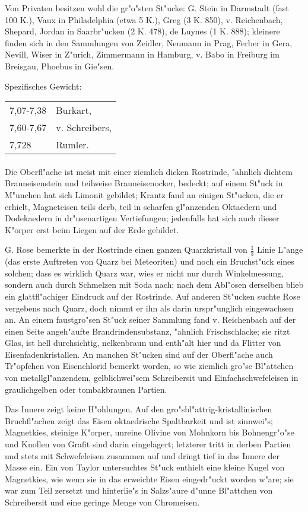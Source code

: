 \documentclass[a4paper, 11pt, oneside]{article}
\begin{document}
Von Privaten besitzen wohl die gr"o"sten St"ucke: G. Stein in Darmstadt (fast 100 K.), Vaux in Philadelphia (etwa 5 K.), Greg (3 K. 850), v. Reichenbach, Shepard, Jordan in Saarbr"ucken (2 K. 478), de Luynes (1 K. 888); kleinere finden sich in den Sammlungen von Zeidler, Neumann in Prag, Ferber in Gera, Nevill, Wiser in Z"urich, Zimmermann in Hamburg, v. Babo in Freiburg im Breisgau, Phoebus in Gie"sen.

Spezifisches Gewicht:  
\begin{table}[!ht]
    \centering
    \begin{tabular}{l l}
        7,07-7,38 & Burkart,\\
        7,60-7,67 & v. Schreibers,\\
        7,728 & Rumler.
    \end{tabular}
\end{table}
\paragraph{}
Die Oberfl"ache ist meist mit einer ziemlich dicken Rostrinde, "ahnlich dichtem Brauneisenstein und teilweise Brauneisenocker, bedeckt; auf einem St"uck in M"unchen hat sich Limonit gebildet; Krantz fand an einigen St"ucken, die er erhielt, Magneteisen teils derb, teil in scharfen gl"anzenden Oktaedern und Dodekaedern in dr"usenartigen Vertiefungen; jedenfalls hat sich auch dieser K"orper erst beim Liegen auf der Erde gebildet.

G. Rose bemerkte in der Rostrinde einen ganzen Quarzkristall von $\frac{1}{3}$ Linie L"ange (das erste Auftreten von Quarz bei Meteoriten) und noch ein Bruchst"uck eines solchen; dass es wirklich Quarz war, wies er nicht nur durch Winkelmessung, sondern auch durch Schmelzen mit Soda nach; nach dem Abl"osen derselben blieb ein glattfl"achiger Eindruck auf der Rostrinde. Auf anderen St"ucken suchte Rose vergebens nach Quarz, doch nimmt er ihn als darin urspr"unglich eingewachsen an. An einem faustgro"sen St"uck seiner Sammlung fand v. Reichenbach auf der einen Seite angeh"aufte Brandrindensubstanz, "ahnlich Frischschlacke; sie ritzt Glas, ist hell durchsichtig, nelkenbraun und enth"alt hier und da Flitter von Eisenfadenkristallen. An manchen St"ucken sind auf der Oberfl"ache auch Tr"opfchen von Eisenchlorid bemerkt worden, so wie ziemlich gro"se Bl"attchen von metallgl"anzendem, gelblichwei"sem Schreibersit und Einfachschwefeleisen in graulichgelben oder tombakbraunen Partien.

Das Innere zeigt keine H"ohlungen. Auf den gro"sbl"attrig-kristallinischen Bruchfl"achen zeigt das Eisen oktaedrische Spaltbarkeit und ist zinnwei"s; Magnetkies, steinige K"orper, unreine Olivine von Mohnkorn bis Bohnengr"o"se und Knollen von Grafit sind darin eingelagert; letzterer tritt in derben Partien und stets mit Schwefeleisen zusammen auf und dringt tief in das Innere der Masse ein. Ein von Taylor untersuchtes St"uck enthielt eine kleine Kugel von Magnetkies, wie wenn sie in das erweichte Eisen eingedr"uckt worden w"are; sie war zum Teil zersetzt und hinterlie"s in Salzs"aure d"unne Bl"attchen von Schreibersit und eine geringe Menge von Chromeisen.
\end{document}
